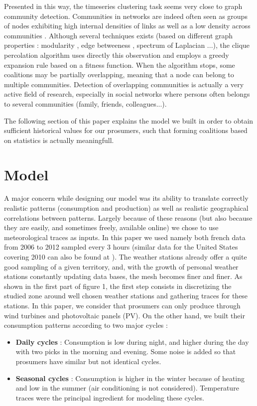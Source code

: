 \documentclass[conference]{IEEEtran}
\begin{document}
Presented in this way, the timeseries clustering task seems very close to graph community detection. Communities in networks are indeed often seen as groups of nodes exhibiting high internal densities of links as well as a low density across communities \cite{Newmanb}. Although several techniques exists (based on different graph properties : modularity \cite{Newmanb}, edge betweeness \cite{Girvan2002}, spectrum of Laplacian \cite{Newman}...), the clique percolation algorithm \cite{Lancichinetti} uses directly this observation and employs a greedy expansion rule based on a fitness function. When the algorithm stops, some coalitions may be partially overlapping, meaning that a node can belong to multiple communities. Detection of overlapping communities is actually a very active field of research, especially in social networks where persons often belongs to several communities (family, friends, colleagues...).

The following section of this paper explains the model we built in order to obtain sufficient historical values for our prosumers, such that forming coalitions based on statistics is actually meaningfull. 

\section{Model}
\label{sec:model}

A major concern while designing our model was its ability to translate correctly realistic patterns (consumption and production) as well as realistic geographical correlations between patterns. Largely because of these reasons (but also because they are easily, and sometimes freely, available online) we chose to use meteorological traces as inputs. In this paper we used namely both french data from 2006 to 2012 sampled every 3 hours \cite{Infoclimat} (similar data for the United States covering 2010 can also be found at \cite{NCDC}). The weather stations already offer a quite good sampling of a given territory, and, with the growth of personal weather stations constantly updating data bases, the mesh becomes finer and finer. As shown in the first part of figure 1, the first step consists in discretizing the studied zone around well chosen weather stations and gathering traces for these stations. In this paper, we consider that prosumers can only produce through wind turbines and photovoltaic panels (PV). On the other hand, we built their consumption patterns according to two major cycles :
\begin{itemize}
\item \textbf{Daily cycles} : Consumption is low during night, and higher during the day with two picks in the morning and evening. Some noise is added so that prosumers have similar but not identical cycles.
\item \textbf{Seasonal cycles} : Consumption is higher in the winter because of heating and low in the summer (air conditioning is not considered). Temperature traces were the principal ingredient for modeling these cycles.
\end{itemize} 
\end{document}
